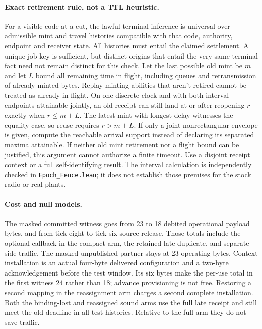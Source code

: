 \documentclass{article}
\begin{document}
\paragraph{Exact retirement rule, not a TTL heuristic.}
For a visible code at a cut, the lawful terminal inference is
universal over admissible mint and travel histories compatible with
that code, authority, endpoint and receiver state. All histories must
entail the claimed settlement. A unique job key is sufficient, but
distinct origins that entail the very same terminal fact need not
remain distinct for this check. Let the last possible old mint
be $m$ and let $L$ bound all remaining time in flight, including
queues and retransmission of already minted bytes. Replay minting
abilities that aren't retired cannot be treated as already in flight.
On one discrete clock and with both interval endpoints attainable
jointly, an old receipt can still land at or after reopening $r$
exactly when $r\leq m+L$. The latest mint with longest delay witnesses
the equality case, so reuse requires $r>m+L$. If only a joint
nonrectangular envelope is given, compute the reachable arrival
support instead of declaring its separated maxima attainable.
If neither old mint retirement nor a flight bound can be justified,
this argument cannot authorize a finite timeout. Use a disjoint
receipt context or a full self-identifying result. The interval
calculation is independently checked in \verb|Epoch_Fence.lean|;
it does not establish those premises for the stock radio or real plants.

\paragraph{Cost and null models.}
The masked committed witness goes from 23 to 18 debited operational
payload bytes, and from tick-eight to tick-six source release. Those
totals include the optional callback in the compact arm, the
retained late duplicate, and separate side traffic. The masked
unpublished partner stays at 23 operating bytes. Context installation
is an actual four-byte delivered configuration and a two-byte
acknowledgement before the test window. Its six bytes make the
per-use total in the first witness 24 rather than 18; advance
provisioning is not free. Restoring a second mapping in the
reassignment arm charges a second complete installation. Both the
binding-lost and reassigned sound arms use the full late receipt
and still meet the old deadline in all test histories. Relative
to the full arm they do not save traffic.
\end{document}
